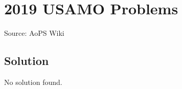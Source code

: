 \documentclass[12pt]{article}
\begin{document}
\section*{{2019 USAMO Problems}}
Source: AoPS Wiki

\subsection*{Solution}
No solution found.
\end{document}
